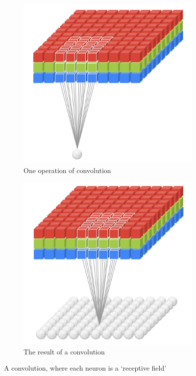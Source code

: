 \begin{figure}[H]
\begin{subfigure}[t]{.5\textwidth}
  \vskip 0pt
  \centering
  \includegraphics[width=.8\linewidth]{Images/conv1.png}
  \caption{One operation of convolution}
\end{subfigure}
\begin{subfigure}[t]{.5\textwidth}
  \vskip 0pt 
  \centering
  \includegraphics[width=.8\linewidth]{Images/conv2.png}
  \caption{The result of a convolution}
\end{subfigure}
\caption{A convolution, where each neuron is a `receptive field' \cite{gorner}}
\label{convolution}
\end{figure}

